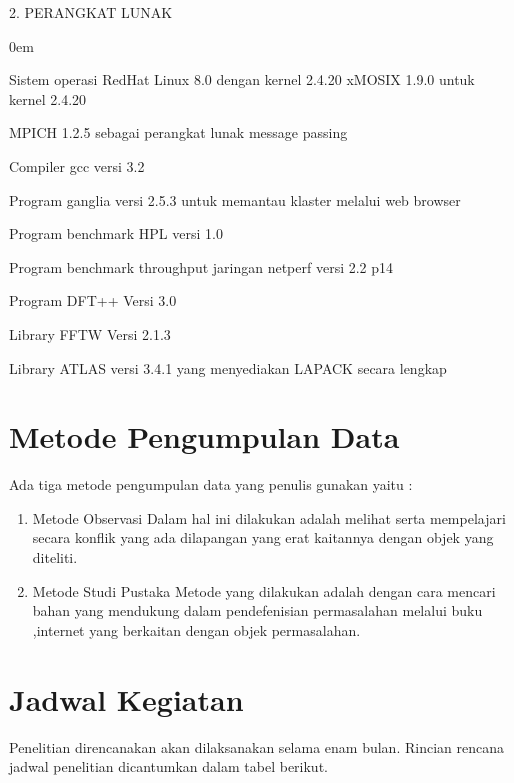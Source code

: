 \documentclass{jtetiproposalskripsi}
\begin{document}
2. PERANGKAT LUNAK
\vspace{-0.5cm}
\begin{enumerate}[a.]
\begin{singlespace}
\itemsep0em
\item Sistem operasi RedHat Linux 8.0 dengan kernel 2.4.20 xMOSIX 1.9.0 untuk kernel 2.4.20 
\item MPICH 1.2.5 sebagai perangkat lunak message passing 
\item Compiler gcc versi 3.2 
\item Program ganglia versi 2.5.3 untuk memantau klaster melalui  web browser 
\item Program benchmark HPL versi 1.0 
\item Program  benchmark throughput jaringan netperf versi 2.2 p14
\item Program DFT++ Versi 3.0
\item Library FFTW Versi 2.1.3
\item Library  ATLAS versi 3.4.1 yang menyediakan LAPACK secara lengkap
\end{singlespace}
\end{enumerate}

\section{Metode Pengumpulan Data}
Ada tiga metode pengumpulan data yang penulis gunakan yaitu : 

\begin{enumerate}[1.]
\item Metode Observasi Dalam hal ini dilakukan adalah melihat serta mempelajari secara konflik yang ada dilapangan yang erat kaitannya dengan objek yang diteliti. 
\item Metode Studi Pustaka Metode yang dilakukan adalah dengan cara mencari bahan yang mendukung dalam pendefenisian permasalahan melalui buku ,internet yang berkaitan dengan objek permasalahan.
\end{enumerate}

\section{Jadwal Kegiatan}
Penelitian direncanakan akan dilaksanakan selama enam bulan. Rincian rencana jadwal penelitian dicantumkan dalam tabel berikut.
\end{document}
